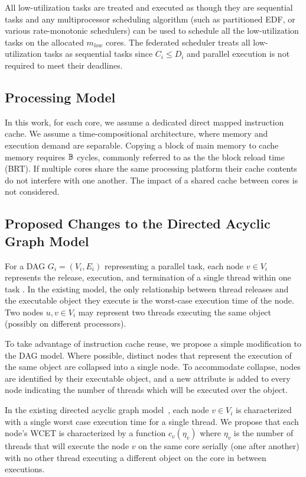 All low-utilization tasks are treated and executed as though they are
sequential tasks and any multiprocessor scheduling algorithm (such as
partitioned EDF, or various rate-monotonic schedulers) can be used to
schedule all the low-utilization tasks on the allocated $m_{low}$
cores. The federated scheduler treats all low-utilization tasks as sequential tasks
since $C_{i} \le D_{i}$ and parallel execution is not required to meet their
deadlines. 

\subsection{Processing Model}

In this work, for each core, we assume a dedicated direct mapped
instruction cache. We assume a time-compositional architecture\addcite,
where memory and execution demand are separable. Copying a block of 
main memory to cache memory requires $\mathbb{B}$ cycles, commonly
referred to as the the block reload time (BRT). If multiple cores share
the same processing platform their cache contents do not interfere with
one another. The impact of a shared cache between cores is not considered.


\subsection{Proposed Changes to the Directed Acyclic Graph Model}
For a DAG ${G_i = (V_i, E_i)}$ representing a parallel task, each node ${v \in V_i}$ represents
the release, execution, and termination of a single thread within one task 
\cite{li2014analysis}. In the existing model, the only relationship between thread releases and the executable object they execute is the worst-case execution time of the node. Two nodes ${u, v \in V_i}$ may represent two threads executing the same object (possibly on different processors).

To take advantage of instruction cache reuse, we propose a simple modification to the DAG
model. Where possible, distinct nodes that represent the execution of
the same object are collapsed into a single node. To accommodate collapse,
nodes are identified by their executable object, and a new attribute is added to every node
indicating the number of threads which will be executed over the object.

In the existing directed acyclic graph model~\cite{li2014analysis}, each node ${v \in V_i}$ is characterized
with a single worst case execution time for a single thread. We
propose that each node's WCET is characterized by a function
${c_{v}(\eta_{v})}$ where $\eta_{v}$ is the number of threads that will execute the
node ${v}$ on the same core serially (one after another) with no
other thread executing a different object on the core in between executions.

